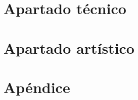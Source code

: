 \documentclass[a4paper,11pt,titlepage]{book}
\begin{document}
%
%        
%        
%


        


        
\chapter{Apartado técnico}
\label{chap:tecnico}


\chapter{Apartado artístico}
\label{chap:artistico}


    
\chapter{Apéndice}
\label{chap:apendice}

   
\end{document}
